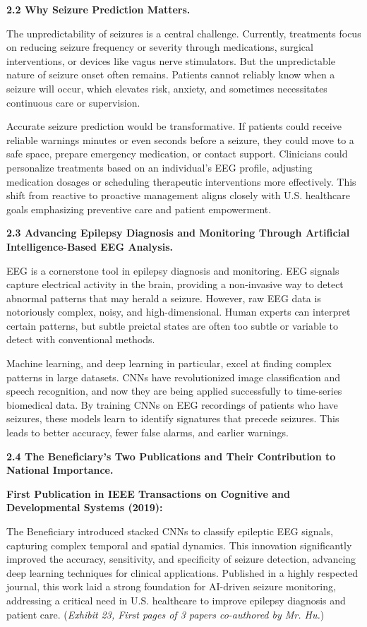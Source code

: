 \documentclass{article}
\begin{document}
{\bf 2.2 Why Seizure Prediction Matters. }

The unpredictability of seizures is a central challenge. Currently, treatments focus on reducing seizure frequency or severity through medications, surgical interventions, or devices like vagus nerve stimulators. But the unpredictable nature of seizure onset often remains. Patients cannot reliably know when a seizure will occur, which elevates risk, anxiety, and sometimes necessitates continuous care or supervision.

Accurate seizure prediction would be transformative. If patients could receive reliable warnings minutes or even seconds before a seizure, they could move to a safe space, prepare emergency medication, or contact support. Clinicians could personalize treatments based on an individual’s EEG profile, adjusting medication dosages or scheduling therapeutic interventions more effectively. This shift from reactive to proactive management aligns closely with U.S. healthcare goals emphasizing preventive care and patient empowerment.

{\bf 2.3 Advancing Epilepsy Diagnosis and Monitoring Through Artificial Intelligence-Based EEG Analysis. }

EEG is a cornerstone tool in epilepsy diagnosis and monitoring. EEG signals capture electrical activity in the brain, providing a non-invasive way to detect abnormal patterns that may herald a seizure. However, raw EEG data is notoriously complex, noisy, and high-dimensional. Human experts can interpret certain patterns, but subtle preictal states are often too subtle or variable to detect with conventional methods.

Machine learning, and deep learning in particular, excel at finding complex patterns in large datasets. CNNs have revolutionized image classification and speech recognition, and now they are being applied successfully to time-series biomedical data. By training CNNs on EEG recordings of patients who have seizures, these models learn to identify signatures that precede seizures. This leads to better accuracy, fewer false alarms, and earlier warnings.

{\bf 2.4 The Beneficiary’s Two Publications and Their Contribution to National Importance. }

{\bf First Publication in IEEE Transactions on Cognitive and Developmental Systems (2019):}

The Beneficiary introduced stacked CNNs to classify epileptic EEG signals, capturing complex temporal and spatial dynamics. This innovation significantly improved the accuracy, sensitivity, and specificity of seizure detection, advancing deep learning techniques for clinical applications. Published in a highly respected journal, this work laid a strong foundation for AI-driven seizure monitoring, addressing a critical need in U.S. healthcare to improve epilepsy diagnosis and patient care. ({\it Exhibit 23, First pages of 3 papers co-authored by Mr. Hu.}) 
\end{document}

